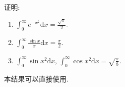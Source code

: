 \documentclass[../../main.tex]{subfiles}
\begin{document}
\begin{proposition}\label{proposition:重要定积分结果(必记)}
证明:
\begin{enumerate}[(1)]
\item \(\int_{0}^{\infty} e^{-x^{2}}\mathrm{d}x=\frac{\sqrt{\pi}}{2}\).

\item \(\int_{0}^{\infty} \frac{\sin x}{x}\mathrm{d}x=\frac{\pi}{2}\).

\item\(\int_{0}^{\infty} \sin x^{2}\mathrm{d}x\), \(\int_{0}^{\infty} \cos x^{2}\mathrm{d}x=\sqrt{\frac{\pi}{8}}\). 
\end{enumerate}
\end{proposition}
\begin{note}
本结果可以直接使用.
\end{note}
\end{document}
